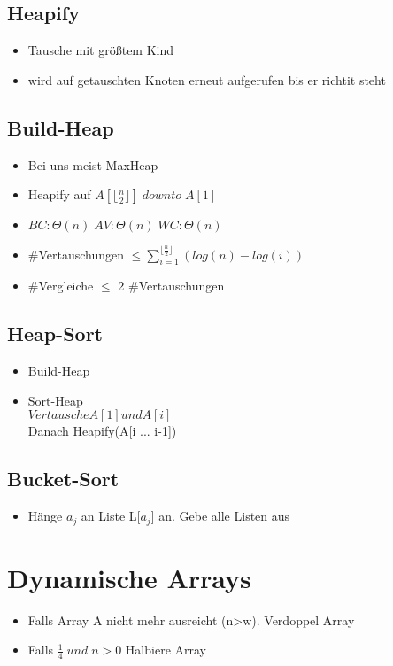 \documentclass{article}
\begin{document}
\subsection{Heapify}
\begin{itemize}
\item Tausche mit gr{\"o}\ss tem Kind
\item wird auf getauschten Knoten erneut aufgerufen bis er richtit steht
\end{itemize}
\subsection{Build-Heap}
\begin{itemize}
\item Bei uns meist MaxHeap
\item Heapify auf $A[\lfloor \frac{n}{2} \rfloor] \; downto  \;A[1]$
\item $BC: \Theta(n)\; AV:\Theta(n)\; WC: \Theta(n)\;$
\item \#Vertauschungen $\leq \sum_{i=1}^{\lfloor \frac{n}{2} \rfloor} (log(n) -log(i))$
\item \#Vergleiche $\leq$ 2 \#Vertauschungen
\end{itemize}

\subsection{Heap-Sort}
\begin{itemize}
\item Build-Heap
\item Sort-Heap \\
$Vertausche A[1] und A[i]$\\
Danach Heapify(A[i ... i-1])\\
\end{itemize}

\subsection{Bucket-Sort}
\begin{itemize}
\item H{\"a}nge $a_j$ an Liste L[$a_j$] an. Gebe alle Listen aus
\end{itemize}

\section{Dynamische Arrays}
\begin{itemize}
\item Falls Array A nicht mehr ausreicht (n>w). Verdoppel Array 
\item Falls $\frac{1}{4} \; und \; n>0$ Halbiere Array
\end{itemize}
\end{document}

